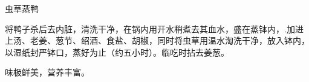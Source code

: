 \begin{recipe}{虫草蒸鸭}

\ingredients




\cooking

将鸭子杀后去内脏，清洗干净，在锅内用开水稍煮去其血水，盛在蒸钵内，.加进上汤、老姜、葱节、绍酒、食盐、胡椒，同时将虫草用温水淘洗干净，放入钵内，以湿纸封严钵口，蒸好为止（约五小时）。临吃时拈去姜葱。

\notes

味极鲜美，营养丰富。

\end{recipe}

